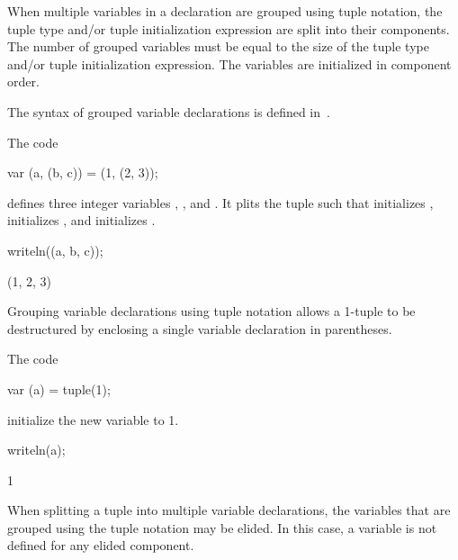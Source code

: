 When multiple variables in a declaration are grouped using tuple
notation, the tuple type and/or tuple initialization expression are
split into their components.  The number of grouped variables must be
equal to the size of the tuple type and/or tuple initialization
expression.  The variables are initialized in component order.

The syntax of grouped variable declarations is defined
in~.

\begin{example}
\begin{chapelpre}
\end{chapelpre}
The code
\begin{chapel}
var (a, (b, c)) = (1, (2, 3));
\end{chapel}
defines three integer variables , , and .  It
plits the tuple  such that 
initializes ,  initializes , and 
initializes .
\begin{chapelpost}
writeln((a, b, c));
\end{chapelpost}
\begin{chapeloutput}
(1, 2, 3)
\end{chapeloutput}
\end{example}

Grouping variable declarations using tuple notation allows a 1-tuple
to be destructured by enclosing a single variable declaration in
parentheses.
\begin{example}
\begin{chapelpre}
\end{chapelpre}
The code
\begin{chapel}
var (a) = tuple(1);
\end{chapel}
initialize the new variable  to 1.
\begin{chapelpost}
writeln(a);
\end{chapelpost}
\begin{chapeloutput}
1
\end{chapeloutput}
\end{example}

When splitting a tuple into multiple variable declarations, the
variables that are grouped using the tuple notation may be elided.  In
this case, a variable is not defined for any elided component.

